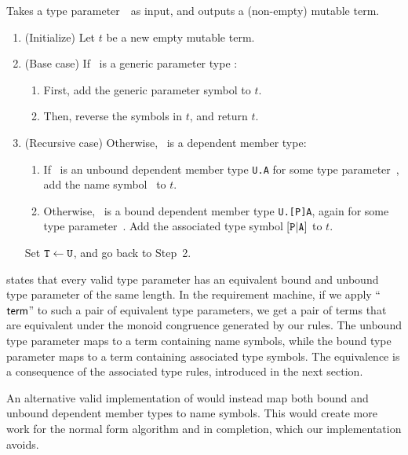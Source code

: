 \documentclass[../generics]{subfiles}
\begin{document}
\begin{algorithm}\label{build term generic}
Takes a type parameter~\tT\ as input, and outputs a (non-empty) mutable term.
\begin{enumerate}
\item (Initialize) Let $t$ be a new empty mutable term.
\item (Base case) If \tT\ is a generic parameter type :
\begin{enumerate}
\item First, add the generic parameter symbol  to $t$.
\item Then, reverse the symbols in $t$, and return $t$.
\end{enumerate}
\item (Recursive case) Otherwise, \tT\ is a dependent member type:
\begin{enumerate}
\item If \tT\ is an unbound dependent member type \verb|U.A| for some type parameter~\tU, add the name symbol \nA\ to $t$.
\item Otherwise, \tT\ is a bound dependent member type \verb|U.[P]A|, again for some type parameter~\tU. Add the associated type symbol $[\texttt{P}|\texttt{A}]$ to $t$.
\end{enumerate}
Set $\texttt{T} \leftarrow \texttt{U}$, and go back to Step~2.
\end{enumerate}
\end{algorithm}

 states that every valid type parameter has an equivalent bound and unbound type parameter of the same length. In the requirement machine, if we apply ``$\mathsf{term}$'' to such a pair of equivalent type parameters, we get a pair of terms that are equivalent under the monoid congruence generated by our rules. The unbound type parameter maps to a term containing name symbols, while the bound type parameter maps to a term containing associated type symbols. The equivalence is a consequence of the associated type rules, introduced in the next section.

An alternative valid implementation of  would instead map both bound and unbound dependent member types to name symbols. This would create more work for the normal form algorithm and in completion, which our implementation avoids.
\end{document}

